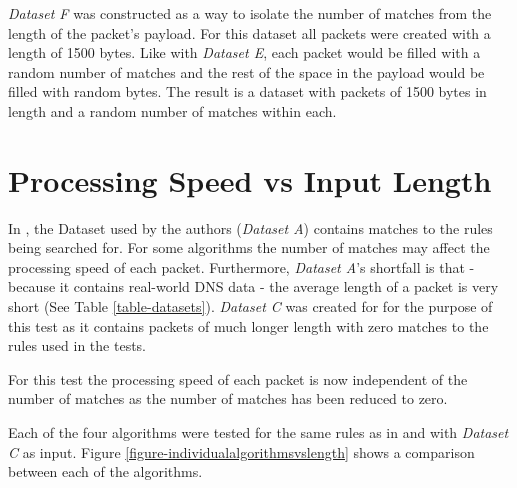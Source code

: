 \documentclass[11pt]{article}
\begin{document}
\textit{Dataset F} was constructed as a way to isolate the number of matches from the length of the packet's payload. For this dataset all packets were created with a length of 1500 bytes. Like with \textit{Dataset E}, each packet would be filled with a random number of matches and the rest of the space in the payload would be filled with random bytes. The result is a dataset with packets of 1500 bytes in length and a random number of matches within each.

\section{Processing Speed vs Input Length} \label{sec-processingspeecvsinputlength}

In \citet{hunt2016}, the Dataset used by the authors (\textit{Dataset A}) contains matches to the rules being searched for. For some algorithms the number of matches may affect the processing speed of each packet. Furthermore, \textit{Dataset A}'s shortfall is that - because it contains real-world DNS data - the average length of a packet is very short (See Table \ref{table-datasets}). \textit{Dataset C} was created for for the purpose of this test as it contains packets of much longer length with zero matches to the rules used in the tests.

For this test the processing speed of each packet is now independent of the number of matches as the number of matches has been reduced to zero.

Each of the four algorithms were tested for the same rules as in \citet{hunt2016} and with \textit{Dataset C} as input. Figure \ref{figure-individualalgorithmsvslength} shows a comparison between each of the algorithms.
\end{document}
